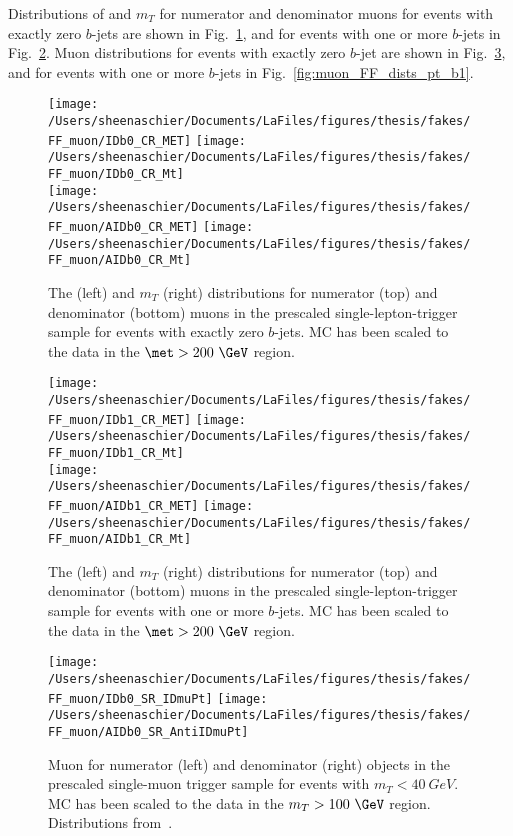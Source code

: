 Distributions of \met{} and $m_{T}$ for numerator and denominator muons for events with exactly zero $b$-jets are shown in Fig.~\ref{fig:muon_FF_dists_b0}, and for events with one or more $b$-jets in Fig.~\ref{fig:muon_FF_dists_b1}.  Muon \pt{} distributions for events with exactly zero $b$-jet are shown in Fig.~\ref{fig:muon_FF_dists_pt_b0}, and for events with one or more $b$-jets in Fig.~\ref{fig:muon_FF_dists_pt_b1}.

\begin{figure}[tbp]
  \centering
  \texttt{[image: /Users/sheenaschier/Documents/LaFiles/figures/thesis/fakes/FF\_muon/IDb0\_CR\_MET]}
  \texttt{[image: /Users/sheenaschier/Documents/LaFiles/figures/thesis/fakes/FF\_muon/IDb0\_CR\_Mt]}\\
  \texttt{[image: /Users/sheenaschier/Documents/LaFiles/figures/thesis/fakes/FF\_muon/AIDb0\_CR\_MET]}
  \texttt{[image: /Users/sheenaschier/Documents/LaFiles/figures/thesis/fakes/FF\_muon/AIDb0\_CR\_Mt]}
  \caption{The \met{} (left) and  $m_{T}$ (right) distributions for numerator (top) and denominator (bottom) muons in the prescaled single-lepton-trigger sample for events with exactly zero $b$-jets.  MC has been scaled to the data in the $\met > 200~\GeV$ region.}
  \label{fig:muon_FF_dists_b0}
\end{figure}

\begin{figure}[tbp]
  \centering
  \texttt{[image: /Users/sheenaschier/Documents/LaFiles/figures/thesis/fakes/FF\_muon/IDb1\_CR\_MET]}
  \texttt{[image: /Users/sheenaschier/Documents/LaFiles/figures/thesis/fakes/FF\_muon/IDb1\_CR\_Mt]}\\
  \texttt{[image: /Users/sheenaschier/Documents/LaFiles/figures/thesis/fakes/FF\_muon/AIDb1\_CR\_MET]}
  \texttt{[image: /Users/sheenaschier/Documents/LaFiles/figures/thesis/fakes/FF\_muon/AIDb1\_CR\_Mt]}
  \caption{The \met{} (left) and $m_{T}$ (right) distributions for numerator (top) and denominator (bottom) muons in the prescaled single-lepton-trigger sample for events with one or more $b$-jets.  MC has been scaled to the data in the $\met > 200~\GeV$ region.}
  \label{fig:muon_FF_dists_b1}
\end{figure}

\begin{figure}[tbp]
  \centering
  \texttt{[image: /Users/sheenaschier/Documents/LaFiles/figures/thesis/fakes/FF\_muon/IDb0\_SR\_IDmuPt]}
  \texttt{[image: /Users/sheenaschier/Documents/LaFiles/figures/thesis/fakes/FF\_muon/AIDb0\_SR\_AntiIDmuPt]}
  \caption{Muon \pt{} for numerator (left) and denominator (right) objects in the prescaled single-muon trigger sample for events with $m_{T} < 40~ GeV$.  MC has been scaled to the data in the $m_{T} > 100~\GeV$ region. Distributions from~\cite{Boerner:2231917}.}
  \label{fig:muon_FF_dists_pt_b0}
\end{figure}

